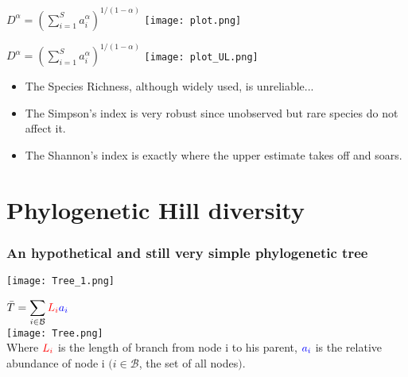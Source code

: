 \documentclass[10pt]{beamer}
\begin{document}
\begin{frame}

	\begin{center}
	$ \displaystyle  D^{\alpha} 
 =\left( \sum_{i=1}^{S} a_i^{\alpha} \right)^{1/(1-\alpha)}$
       \texttt{[image: plot.png]}
	\end{center}
\end{frame}

\begin{frame}
	\begin{center}
	$ \displaystyle  D^{\alpha} 
 =\left( \sum_{i=1}^{S} a_i^{\alpha} \right)^{1/(1-\alpha)}$
       \texttt{[image: plot\_UL.png]}
	\end{center}
\end{frame}


\begin{frame}[cc]
	\begin{itemize}
	\item<1> The Species Richness, although widely used, is unreliable...
	\item<1> The Simpson's index is very robust since unobserved but rare species do not affect it.
	\item<1> The Shannon's index is exactly where the upper estimate takes off and soars.
	\end{itemize}
	
	
	
\end{frame}



\section{Phylogenetic Hill diversity}
\frametitle{An hypothetical and still very simple phylogenetic tree}
\begin{frame}

	\begin{center}
       \texttt{[image: Tree\_1.png]}
	\end{center}

\end{frame}

\begin{frame}
	\begin{center}
	 $\displaystyle \bar{T}= \sum_{i \in \mathcal{B}} \mathbin{\textcolor{red}{L_i}} \mathbin{\textcolor{blue}{a_i}}$\\
       \texttt{[image: Tree.png]}\\
       Where $\mathbin{\textcolor{red}{L_i}}$ is the length of branch from node i to his parent, $ \mathbin{\textcolor{blue}{a_i}}$ is the relative abundance of node i $( i \in \mathcal{B}$, the set of all nodes$)$.
	\end{center}
\end{frame}
\end{document}
